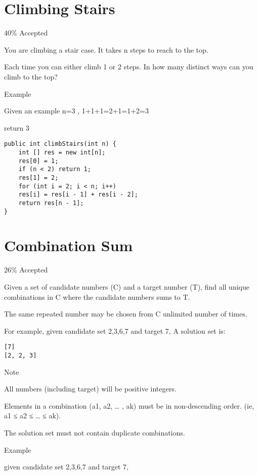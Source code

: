 \documentclass[12pt]{book}
\begin{document}
\chapter{Climbing Stairs}
\label{sec-19}

40\% Accepted

You are climbing a stair case. It takes n steps to reach to the top.

Each time you can either climb 1 or 2 steps. In how many distinct ways can you climb to the top?

Example

Given an example n=3 , 1+1+1=2+1=1+2=3

return 3

\lstset{language=java,label= ,caption= ,numbers=none}
\begin{lstlisting}
public int climbStairs(int n) {
    int [] res = new int[n];
    res[0] = 1;
    if (n < 2) return 1;
    res[1] = 2;
    for (int i = 2; i < n; i++) 
	res[i] = res[i - 1] + res[i - 2];
    return res[n - 1];
}
\end{lstlisting}
\chapter{Combination Sum}
\label{sec-20}

26\% Accepted

Given a set of candidate numbers (C) and a target number (T), find all unique combinations in C where the candidate numbers sums to T.

The same repeated number may be chosen from C unlimited number of times.



For example, given candidate set 2,3,6,7 and target 7, 
A solution set is: 
\lstset{language=java,label= ,caption= ,numbers=none}
\begin{lstlisting}
[7] 
[2, 2, 3]
\end{lstlisting}

Note

All numbers (including target) will be positive integers.

Elements in a combination (a1, a2, … , ak) must be in non-descending order. (ie, a1 ≤ a2 ≤ … ≤ ak).

The solution set must not contain duplicate combinations.

Example

given candidate set 2,3,6,7 and target 7, 
\end{document}

